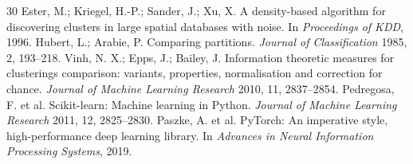 \documentclass[11pt]{article}
\begin{document}
\begin{thebibliography}{30}
 Ester, M.; Kriegel, H.-P.; Sander, J.; Xu, X. A density-based algorithm for discovering clusters in large spatial databases with noise. In \emph{Proceedings of KDD}, 1996.
 Hubert, L.; Arabie, P. Comparing partitions. \emph{Journal of Classification} 1985, 2, 193--218.
 Vinh, N. X.; Epps, J.; Bailey, J. Information theoretic measures for clusterings comparison: variants, properties, normalisation and correction for chance. \emph{Journal of Machine Learning Research} 2010, 11, 2837--2854.
 Pedregosa, F. et al. Scikit-learn: Machine learning in Python. \emph{Journal of Machine Learning Research} 2011, 12, 2825--2830.
 Paszke, A. et al. PyTorch: An imperative style, high-performance deep learning library. In \emph{Advances in Neural Information Processing Systems}, 2019.
\end{thebibliography}
\end{document}
